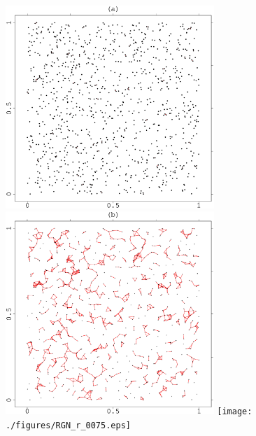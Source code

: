 \documentclass[12pt]{article}
\begin{document}
\begin{figure}[hb!]
\begin{center}
\includegraphics[width=3.1in]{./figures/RGN_r_001.eps}
\includegraphics[width=3.1in]{./figures/RGN_r_003.eps}
\texttt{[image: ./figures/RGN\_r\_0075.eps]}
\end{center}
\caption{}
\label{fig:Figure4}
\end{figure}
\end{document}
